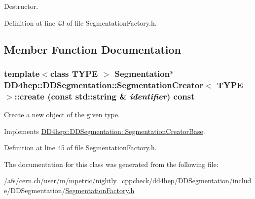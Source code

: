 Destructor. 

Definition at line 43 of file SegmentationFactory.h.

\subsection{Member Function Documentation}
\hypertarget{class_d_d4hep_1_1_d_d_segmentation_1_1_segmentation_creator_a2b9ff4869b443f3b04a017174206281b}{
\subsubsection[{create}]{\setlength{\rightskip}{0pt plus 5cm}template$<$class TYPE $>$ {\bf Segmentation}$\ast$ {\bf DD4hep::DDSegmentation::SegmentationCreator}$<$ TYPE $>$::create (const std::string \& {\em identifier}) const}}
\label{class_d_d4hep_1_1_d_d_segmentation_1_1_segmentation_creator_a2b9ff4869b443f3b04a017174206281b}


Create a new object of the given type. 

Implements \hyperlink{class_d_d4hep_1_1_d_d_segmentation_1_1_segmentation_creator_base_aad60d04fe90588d97eeb8030f8d6daa3}{DD4hep::DDSegmentation::SegmentationCreatorBase}.

Definition at line 45 of file SegmentationFactory.h.

The documentation for this class was generated from the following file:\begin{DoxyCompactItemize}
\item 
/afs/cern.ch/user/m/mpetric/nightly\_\-cppcheck/dd4hep/DDSegmentation/include/DDSegmentation/\hyperlink{_segmentation_factory_8h}{SegmentationFactory.h}\end{DoxyCompactItemize}
